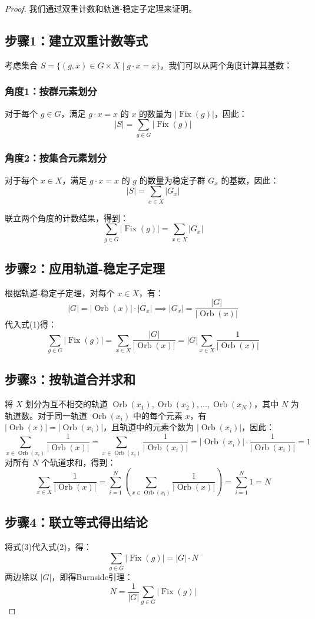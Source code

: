 \documentclass{ctexart}
\newtheorem{proof}{证} %
\DeclareMathOperator{\Orb}{Orb} %
\DeclareMathOperator{\Fix}{Fix}
\begin{document}
    \begin{proof}
        我们通过双重计数和轨道-稳定子定理来证明。
        
        \subsection*{步骤1：建立双重计数等式}
        考虑集合 \( S = \{ (g, x) \in G \times X \mid g \cdot x = x \} \)。我们可以从两个角度计算其基数：
        
        \subsubsection*{角度1：按群元素划分}
        对于每个 \( g \in G \)，满足 \( g \cdot x = x \) 的 \( x \) 的数量为 \( |\Fix(g)| \)，因此：
        \[
        |S| = \sum_{g \in G} |\Fix(g)|
        \]
        
        \subsubsection*{角度2：按集合元素划分}
        对于每个 \( x \in X \)，满足 \( g \cdot x = x \) 的 \( g \) 的数量为稳定子群 \( G_x \) 的基数，因此：
        \[
        |S| = \sum_{x \in X} |G_x|
        \]
        
        联立两个角度的计数结果，得到：
        \[
        \sum_{g \in G} |\Fix(g)| = \sum_{x \in X} |G_x| \tag{1}
        \]
        
        \subsection*{步骤2：应用轨道-稳定子定理}
        根据轨道-稳定子定理，对每个 \( x \in X \)，有：
        \[
        |G| = |\Orb(x)| \cdot |G_x| \implies |G_x| = \frac{|G|}{|\Orb(x)|}
        \]
        代入式(1)得：
        \[
        \sum_{g \in G} |\Fix(g)| = \sum_{x \in X} \frac{|G|}{|\Orb(x)|} = |G| \sum_{x \in X} \frac{1}{|\Orb(x)|} \tag{2}
        \]
        
        \subsection*{步骤3：按轨道合并求和}
        将 \( X \) 划分为互不相交的轨道 \( \Orb(x_1), \Orb(x_2), \dots, \Orb(x_N) \)，其中 \( N \) 为轨道数。对于同一轨道 \( \Orb(x_i) \) 中的每个元素 \( x \)，有 \( |\Orb(x)| = |\Orb(x_i)| \)，且轨道中的元素个数为 \( |\Orb(x_i)| \)，因此：
        \[
        \sum_{x \in \Orb(x_i)} \frac{1}{|\Orb(x)|} = \sum_{x \in \Orb(x_i)} \frac{1}{|\Orb(x_i)|} = |\Orb(x_i)| \cdot \frac{1}{|\Orb(x_i)|} = 1
        \]
        对所有 \( N \) 个轨道求和，得到：
        \[
        \sum_{x \in X} \frac{1}{|\Orb(x)|} = \sum_{i=1}^N \left( \sum_{x \in \Orb(x_i)} \frac{1}{|\Orb(x)|} \right) = \sum_{i=1}^N 1 = N \tag{3}
        \]
        
        \subsection*{步骤4：联立等式得出结论}
        将式(3)代入式(2)，得：
        \[
        \sum_{g \in G} |\Fix(g)| = |G| \cdot N
        \]
        两边除以 \( |G| \)，即得Burnside引理：
        \[
        N = \frac{1}{|G|} \sum_{g \in G} |\Fix(g)|
        \]
        \end{proof}
\end{document}
